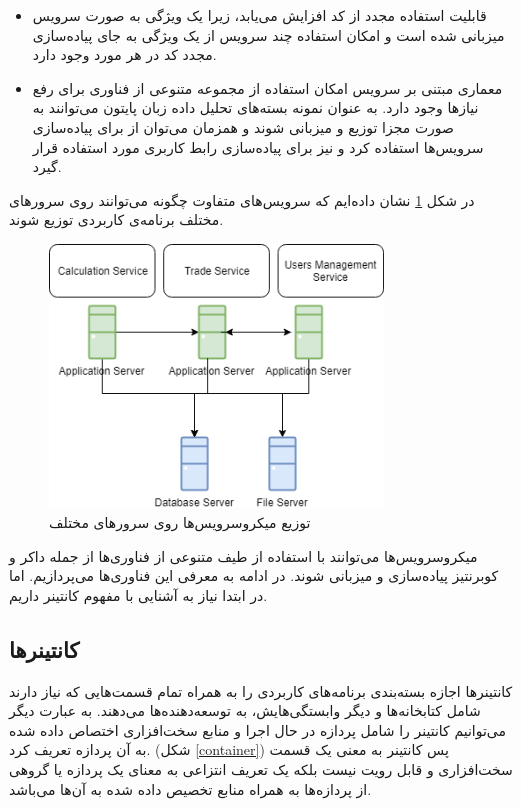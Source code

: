 \begin{itemize}
	\item قابلیت استفاده مجدد از کد افزایش می‌یابد، زیرا یک ویژگی به صورت سرویس میزبانی شده است و امکان استفاده چند سرویس از یک ویژگی به جای پیاده‌سازی مجدد کد در هر مورد وجود دارد.
	
	\item معماری مبتنی بر سرویس امکان استفاده از مجموعه متنوعی از فناوری برای رفع نیازها وجود دارد. به عنوان نمونه بسته‌های تحلیل داده زبان پایتون می‌توانند به صورت مجزا توزیع و میزبانی شوند و همزمان می‌توان از  برای پیاده‌سازی سرویس‌ها استفاده کرد و  نیز برای پیاده‌سازی رابط کاربری مورد استفاده قرار گیرد.
	
\end{itemize}

در شکل \ref{distribution-microservices} نشان داده‌ایم که سرویس‌های متفاوت چگونه می‌توانند روی سرورهای مختلف برنامه‌ی کاربردی توزیع شوند.
\cite{malik_2019}

\begin{figure}[!h]
	\centering
	\includegraphics[height=7cm]{images/distribution-microservices}
	\caption{توزیع میکروسرویس‌ها روی سرورهای مختلف}
	\label{distribution-microservices}
\end{figure}

میکروسرویس‌ها می‌توانند با استفاده از طیف متنوعی از فناوری‌ها از جمله داکر و کوبرنتیز پیاده‌سازی و میزبانی شوند. در ادامه به معرفی این فناوری‌ها می‌پردازیم. اما در ابتدا نیاز به آشنایی با مفهوم کانتینر داریم.

\subsection{کانتینرها}

کانتینرها اجازه بسته‌بندی برنامه‌های کاربردی را به همراه تمام قسمت‌هایی که نیاز دارند شامل کتابخانه‌ها و دیگر وابستگی‌هایش، به توسعه‌دهنده‌ها می‌دهند. به عبارت دیگر می‌توانیم کانتینر را شامل پردازه در حال اجرا و منابع سخت‌افزاری اختصاص داده شده به آن پردازه تعریف کرد. (شکل \ref{container}) پس کانتینر به معنی یک قسمت سخت‌افزاری و قابل رویت نیست بلکه یک تعریف انتزاعی به معنای یک پردازه یا گروهی از پردازه‌ها به همراه منابع تخصیص داده شده به آن‌ها می‌باشد. 


